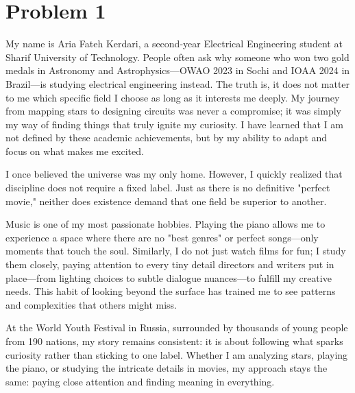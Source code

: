 \documentclass[12pt]{article}
\begin{document}
	
	\newpage
	\pagestyle{fancy}
	\fancyhf{}
	\cfoot{\thepage}
	
	\section{Problem 1}
My name is Aria Fateh Kerdari, a second-year Electrical Engineering student at Sharif University of Technology. People often ask why someone who won two gold medals in Astronomy and Astrophysics—OWAO 2023 in Sochi and IOAA 2024 in Brazil—is studying electrical engineering instead. The truth is, it does not matter to me which specific field I choose as long as it interests me deeply. My journey from mapping stars to designing circuits was never a compromise; it was simply my way of finding things that truly ignite my curiosity. I have learned that I am not defined by these academic achievements, but by my ability to adapt and focus on what makes me excited.

I once believed the universe was my only home. However, I quickly realized that discipline does not require a fixed label. Just as there is no definitive "perfect movie," neither does existence demand that one field be superior to another. 

Music is one of my most passionate hobbies. Playing the piano allows me to experience a space where there are no "best genres" or perfect songs—only moments that touch the soul. Similarly, I do not just watch films for fun; I study them closely, paying attention to every tiny detail directors and writers put in place—from lighting choices to subtle dialogue nuances—to fulfill my creative needs. This habit of looking beyond the surface has trained me to see patterns and complexities that others might miss.

At the World Youth Festival in Russia, surrounded by thousands of young people from 190 nations, my story remains consistent: it is about following what sparks curiosity rather than sticking to one label. Whether I am analyzing stars, playing the piano, or studying the intricate details in movies, my approach stays the same: paying close attention and finding meaning in everything.


	
\end{document}
